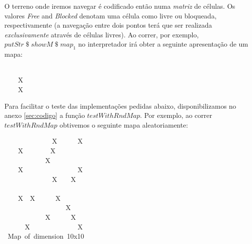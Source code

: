 \documentclass[a4paper]{article}
\newcommand{\Varid}[1]{\mathit{#1}}
\begin{document}
O terreno onde iremos navegar é codificado então numa \emph{matriz} de
células.  Os valores \emph{Free} and \emph{Blocked} denotam uma célula
como livre ou bloqueada, respectivamente (a navegação entre dois
pontos terá que ser realizada \emph{exclusivamente} através de células
livres). Ao correr, por exemplo, \ensuremath{\Varid{putStr}\mathbin{\$}\Varid{showM}\mathbin{\$}map_1 } no interpretador  irá obter a seguinte apresentação de um mapa:
\begin{tabbing}\ttfamily
~~~~~~\\
\ttfamily ~~~~X~~\\
\ttfamily ~~~~X~~
\end{tabbing}
Para facilitar o teste das implementações pedidas abaixo, disponibilizamos no anexo \ref{sec:codigo}
a função \ensuremath{\Varid{testWithRndMap}}. Por exemplo, ao correr
\ensuremath{\Varid{testWithRndMap}} obtivemos o seguinte mapa aleatoriamente:
\begin{tabbing}\ttfamily
~~~~~~~~~~~~~~X~~~~~~X\\
\ttfamily ~~~~X~~~~~~~~X~~~~~~~~\\
\ttfamily ~~~~~~~~~~~~X~~~~~~~~\\
\ttfamily ~~~~X~~~~~~~~~~~~~~~~X\\
\ttfamily ~~~~~~~~~~~~~~X~~~~X~~\\
\ttfamily ~~~~~~~~~~~~~~~~~~~~\\
\ttfamily ~~~~X~~X~~~~~~X~~~~~~~~\\
\ttfamily ~~~~~~~~~~~~~~~~~~X~~\\
\ttfamily ~~~~~~~~~~~~X~~~~~~X~~\\
\ttfamily ~~~~~~X~~~~~~~~~~~~~~X\\
\ttfamily ~Map~of~dimension~10x10
\end{tabbing}
\end{document}
